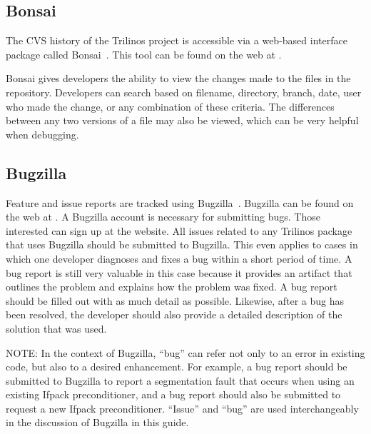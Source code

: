 \documentclass[12pt,relax]{TrilinosDevGuide}
\begin{document}
\subsection{Bonsai}

The CVS history of the Trilinos project is accessible via a
web-based interface package called Bonsai~\cite{Bonsai}.  This tool can be 
found on the web at 
\newline
{}.  

\begin{minipage}[c]{\textwidth}

\begin{minipage}[l]{.6\textwidth}

Bonsai gives developers the ability to view the changes made to the files in 
the repository. Developers can search 
based on filename, directory, branch, date, user who made the 
change, or any combination of these criteria.  The differences between any two 
versions of a file may also be viewed, which can be very helpful when 
debugging.  
\end{minipage}\hfill
{}
\end{minipage}

\subsection{Bugzilla}
\label{subsect:Bugzilla}
Feature and issue reports are tracked using Bugzilla~\cite{Bugzilla}.  
Bugzilla can be found on the web at 
.  
A Bugzilla account is necessary for submitting bugs.  Those interested can 
sign up at the website.  All issues related to any Trilinos package that uses 
Bugzilla should be submitted to Bugzilla.  This even applies to cases in which 
one developer diagnoses and fixes a bug within a short period of time.  A bug 
report is still very valuable in this case because it provides an artifact 
that outlines the problem and explains how the problem was fixed.  A bug 
report should be filled out with as much detail as possible.  Likewise, after 
a bug has been resolved, the developer should also provide a detailed 
description of the solution that was used.

NOTE: In the context of Bugzilla, ``bug'' can refer not only to an error in 
existing code, but also to a desired enhancement.  For example, a bug report 
should be submitted to Bugzilla to report a segmentation fault that occurs 
when using an existing Ifpack preconditioner, and a bug report should also be
submitted to request a new Ifpack preconditioner.  ``Issue'' and ``bug'' are 
used interchangeably in the discussion of Bugzilla in this guide.
\end{document}
